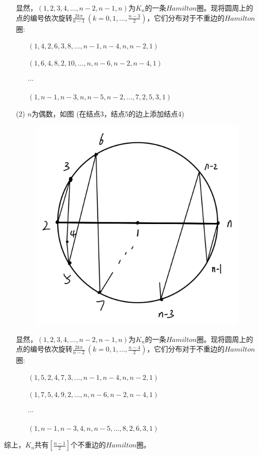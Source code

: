 \documentclass{article}
\begin{document}
\begin{enumerate}
    显然，$(1,2,3,4,\ldots,n-2,n-1,n)$为$K_n$的一条$Hamilton$圈。现将圆周上的点的编号依次旋转$\displaystyle{\frac{2k\pi}{n-1}}\ (k=0,1,\ldots,\displaystyle{\frac{n-3}{2}})$，它们分布对于不重边的$Hamilton$圈:
    \begin{enumerate}
        \item []$(1,4,2,6,3,8,\ldots,n-1,n-4,n,n-2,1)$
        \item []$(1,6,4,8,2,10,\ldots,n,n-6,n-2,n-4,1)$
        \item []$\cdots$
        \item []$(1,n-1,n-3,n,n-5,n-2,\ldots,7,2,5,3,1)$
    \end{enumerate}
    \clearpage
    \item [(2)]$n$为偶数，如图 (在结点3，结点5的边上添加结点4)
    \begin{figure}[htbp]
        \centering
        \includegraphics[scale=0.3]{t122.jpg}
    \end{figure}

    显然，$(1,2,3,4,\ldots,n-2,n-1,n)$为$K_n$的一条$Hamilton$圈。现将圆周上的点的编号依次旋转$\displaystyle{\frac{2k\pi}{n-2}}\ (k=0,1,\ldots,\displaystyle{\frac{n-4}{2}})$，它们分布对于不重边的$Hamilton$圈:
    \begin{enumerate}
        \item []$(1,5,2,4,7,3,\ldots,n-1,n-4,n,n-2,1)$
        \item []$(1,7,5,4,9,2,\ldots,n,n-6,n-2,n-4,1)$
        \item []$\cdots$
        \item []$(1,n-1,n-3,4,n,n-5,\ldots,8,2,6,3,1)$
    \end{enumerate}
\end{enumerate}
综上，$K_n$共有$\left[\displaystyle{\frac{n-1}{2}}\right]$个不重边的$Hamilton$圈。
\end{document}
